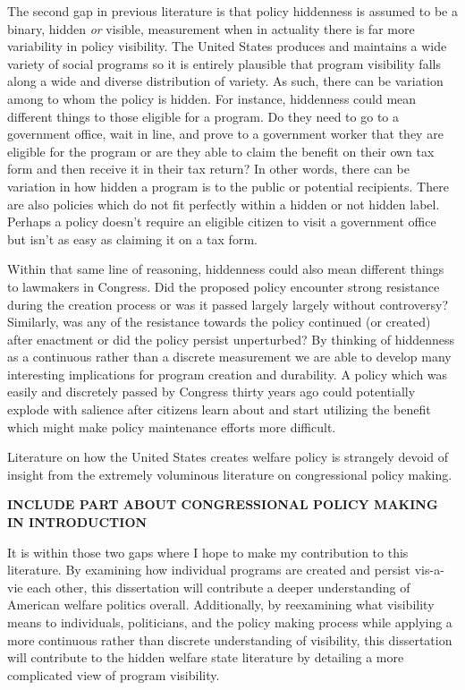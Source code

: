 \documentclass[12pt]{article}
\begin{document}
The second gap in previous literature is that policy hiddenness is assumed to be a binary, hidden \emph{or} visible, measurement when in actuality there is far more variability in policy visibility. The United States produces and maintains a wide variety of social programs so it is entirely plausible that program visibility falls along a wide and diverse distribution of variety. As such, there can be variation among to whom the policy is hidden. For instance, hiddenness could mean different things to those eligible for a program. Do they need to go to a government office, wait in line, and prove to a government worker that they are eligible for the program or are they able to claim the benefit on their own tax form and then receive it in their tax return? In other words, there can be variation in how hidden a program is to the public or potential recipients. There are also policies which do not fit perfectly within a hidden or not hidden label. Perhaps a policy doesn't require an eligible citizen to visit a government office but isn't as easy as claiming it on a tax form.

Within that same line of reasoning, hiddenness could also mean different things to lawmakers in Congress. Did the proposed policy encounter strong resistance during the creation process or was it passed largely largely without controversy? Similarly, was any of the resistance towards the policy continued (or created) after enactment or did the policy persist unperturbed? By thinking of hiddenness as a continuous rather than a discrete measurement we are able to develop many interesting implications for program creation and durability. A policy which was easily and discretely passed by Congress thirty years ago could potentially explode with salience after citizens learn about and start utilizing the benefit which might make policy maintenance efforts more difficult.

Literature on how the United States creates welfare policy is strangely devoid of insight from the extremely voluminous literature on congressional policy making.

\textbf{INCLUDE PART ABOUT CONGRESSIONAL POLICY MAKING IN INTRODUCTION}

It is within those two gaps where I hope to make my contribution to this literature. By examining how individual programs are created and persist vis-a-vie each other, this dissertation will contribute a deeper understanding of American welfare politics overall. Additionally, by reexamining what visibility means to individuals, politicians, and the policy making process while applying a more continuous rather than discrete understanding of visibility, this dissertation will contribute to the hidden welfare state literature by detailing a more complicated view of program visibility.
\end{document}
